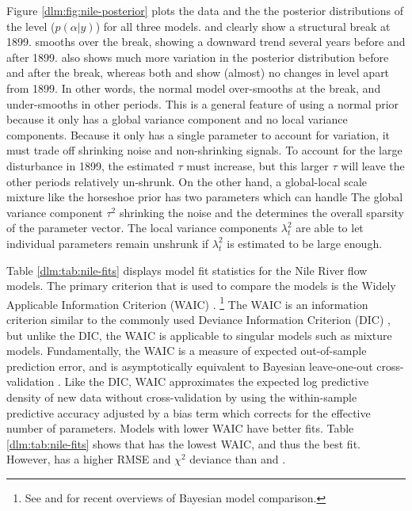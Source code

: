 Figure \ref{dlm:fig:nile-posterior} plots the data and the the posterior distributions of the level ($p(\alpha | y)$) for all three models.
 and  clearly show a structural break at 1899.
 smooths over the break, showing a downward trend several years before and after 1899.
 also shows much more variation in the posterior distribution before and after the break, whereas both  and  show (almost) no changes in level apart from 1899.
In other words, the normal model over-smooths at the break, and under-smooths in other periods.
This is a general feature of using a normal prior because it only has a global variance component and no local variance components.
Because it only has a single parameter to account for variation, it must trade off shrinking noise and non-shrinking signals.
To account for the large disturbance in 1899, the estimated $\tau$ must increase, but this larger $\tau$ will leave the other periods relatively un-shrunk.
On the other hand, a global-local scale mixture like the horseshoe prior has two parameters which can handle
The global variance component $\tau^{2}$ shrinking the noise and the determines the overall sparsity of the parameter vector.
The local variance components $\lambda^{2}_{t}$ are able to let individual parameters remain unshrunk if $\lambda_{t}^{2}$ is estimated to be large enough.

Table \ref{dlm:tab:nile-fits} displays model fit statistics for the Nile River flow models.
The primary criterion that is used to compare the models is the Widely Applicable Information Criterion (WAIC) \parencite{Watanabe2010}.%
\footnote{See \textcite{GelmanHwangVehtari2014a} and \textcite{VehtariOjanen2012} for recent overviews of Bayesian model comparison.}
The WAIC is an information criterion similar to the commonly used Deviance Information Criterion (DIC) \parencite{spiegelhalter2002bayes}, but unlike the DIC, the WAIC is applicable to singular models such as mixture models.
Fundamentally, the WAIC is a measure of expected out-of-sample prediction error, and is asymptotically equivalent to Bayesian leave-one-out cross-validation \parencite{Watanabe2010}.
Like the DIC, WAIC approximates the expected log predictive density of new data without cross-validation by using the within-sample predictive accuracy adjusted by a bias term which corrects for the effective number of parameters.
Models with lower WAIC have better fits.
Table \ref{dlm:tab:nile-fits} shows that  has the lowest WAIC, and thus the best fit.
However,  has a higher RMSE and $\chi^{2}$ deviance than  and .

